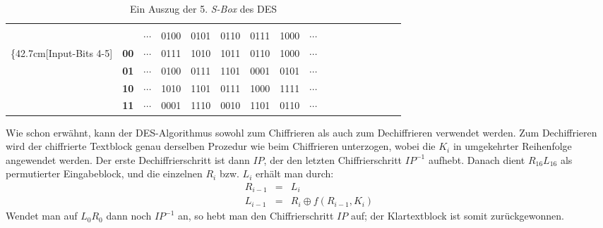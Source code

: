 \begin{table}[h]
	\hspace{-0.5cm}
	\begin{tabularx}{0.8\textwidth}{ r | >{\bfseries}Br | Cc | Cc | Cc | Cc | Cc | Cc | Cc |} 
		&  \\
		& &  \textbf{ $\cdots$ } & \rowstyle{\bfseries}0100 & 0101 & 0110 & 0111 & 1000 & \textbf{$\cdots$} \\ 
		\ldelim\{{4}{2.7cm}[Input-Bits 4-5]
		& 00 & $\cdots$ & 0111 & 1010 & 1011 & 0110 & 1000 & $\cdots$ \\ 
		& 01 & $\cdots$ & 0100 & 0111 & 1101 & 0001 & 0101 & $\cdots$ \\ 
		& 10 & $\cdots$ & 1010 & 1101 & 0111 & 1000 & 1111 & $\cdots$ \\ 
		& 11 & $\cdots$ & 0001 & 1110 & 0010 & 1101 & 0110 & $\cdots$ \\
	\end{tabularx}
	\caption{Ein Auszug der 5. \textit{S-Box} des DES}
	\label{ssec:des:tbl:s-box}
\end{table}

Wie schon erwähnt, kann der DES-Algorithmus sowohl zum Chiffrieren als auch zum Dechiffrieren verwendet werden. Zum Dechiffrieren wird der chiffrierte Textblock genau derselben Prozedur wie beim Chiffrieren unterzogen, wobei die $K_i$ in umgekehrter Reihenfolge angewendet werden. Der erste Dechiffrierschritt ist dann $IP$, der den letzten Chiffrierschritt $IP^{-1}$ aufhebt. Danach dient $R_{16}L_{16}$ als permutierter Eingabeblock, und die einzelnen $R_i$ bzw. $L_i$ erhält man durch:
\begin{eqnarray*}
	R_{i-1}	& = 	& L_i \\
	L_{i-1}	& = 	& R_i \oplus f(R_{i-1}, K_i)
\end{eqnarray*}
Wendet man auf $L_0R_0$ dann noch $IP^{-1}$ an, so hebt man den Chiffrierschritt $IP$ auf; der Klartextblock ist somit zurückgewonnen.

